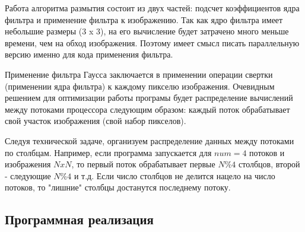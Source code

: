 \documentclass{article}
\begin{document}
\par
Работа алгоритма размытия состоит из двух частей: подсчет коэффициентов ядра фильтра и применение фильтра к изображению. Так как ядро фильтра имеет небольшие размеры (3 x 3), на его вычисление будет затрачено много меньше времени, чем на обход изображения. Поэтому имеет смысл писать параллельную версию именно для кода применения фильтра.
\par
Применение фильтра Гаусса заключается в применении операции свертки (применении ядра фильтра) к каждому пикселю изображения. Очевидным решением для оптимизации работы програмы будет распределение вычислений между потоками процессора следующим образом: каждый поток обрабатывает свой участок изображения (свой набор пикселов).
\par
Следуя технической задаче, организуем распределение данных между потоками по столбцам. Например, если программа запускается для $num = 4$ потоков и изображения $N x N$, то первый поток обрабатывает первые $N \% 4$ столбцов, второй - следующие $N \% 4$ и т.д. Если число столбцов не делится нацело на число потоков, то "лишние" столбцы достанутся последнему потоку.
\newpage

\subsection*{Программная реализация}
\end{document}
